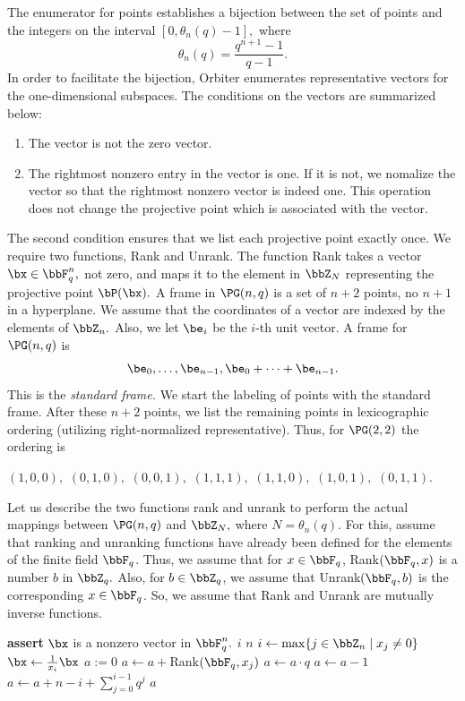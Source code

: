 The enumerator for points establishes a bijection between 
the set of points and the integers on the 
interval $[0,\theta_n(q)-1],$ 
where 
$$
\theta_n(q) = \frac{q^{n+1}-1}{q-1}.
$$
In order to facilitate the bijection, 
Orbiter enumerates representative vectors 
for the one-dimensional subspaces.
The conditions on the vectors are summarized below:
\begin{enumerate}
\item
The vector is not the zero vector.
\item
The rightmost nonzero entry in the vector is one. 
If it is not, we nomalize the vector 
so that the rightmost nonzero vector is indeed one. 
This operation does not change the projective 
point which is associated with the vector.
\end{enumerate}
The second condition ensures that we list 
each projective point exactly once.
We require two functions, 
{\sc Rank} and {\sc Unrank}. The function {\sc Rank} takes a vector 
$\bx \in \bbF_q^n,$ 
not zero, and maps it to the element in $\bbZ_N$ 
representing the projective point 
$\bP(\bx).$
A frame in $\PG(n,q)$ is a set of $n+2$ points, no $n+1$ in a hyperplane. 
We assume that the coordinates of a vector 
are indexed by the elements of $\bbZ_n.$ 
Also, we let $\be_i$ be the $i$-th unit vector. 
A frame for $\PG(n,q)$ is  
$$
\be_0,\ldots,\be_{n-1}, \be_0+\cdots+\be_{n-1}.
$$
This is the {\em standard frame.} 
We start the labeling of points with the  
standard frame. After these $n+2$ points, 
we list the remaining points 
in lexicographic ordering (utilizing right-normalized representative).
Thus, for $\PG(2,2)$ the  ordering is
\begin{center}
$(1,0,0),$
$(0,1,0),$
$(0,0,1),$
$(1,1,1),$
$(1,1,0),$
$(1,0,1),$
$(0,1,1).$
\end{center}
Let us describe the two functions rank and unrank 
to perform the actual mappings 
between $\PG(n,q)$ and $\bbZ_{N},$ where $N = \theta_n(q).$
For this, assume that ranking and unranking 
functions have already been defined for the 
elements of the finite field $\bbF_q$.
Thus, we assume that for $x \in \bbF_q$, 
{\sc Rank}$(\bbF_q,x)$ is a number $b$ in $\bbZ_q.$
Also, for $b \in \bbZ_q$, 
we assume that {\sc Unrank}$(\bbF_q,b)$ is the 
corresponding $x \in \bbF_q$.
So, we assume that 
{\sc Rank} and {\sc Unrank} are mutually inverse functions.  
\begin{algorithm}
\caption{Rank}\label{algo:Rank}
\begin{algorithmic}[1]
\State \textbf{assert} $\bx$ is a nonzero vector in $\bbF_q^n.$
\State \Return $i$
\EndIf
\If {$\bx = \bone$} 
\State \Return $n$
\EndIf
\State $i \gets \max\{j \in \bbZ_n \mid x_j \neq 0\}$
\State $\bx \gets \frac{1}{x_i} \bx$
\State $a := 0$
\State $a \gets a + ${\sc Rank}$(\bbF_q, x_j)$
\State $ a \gets a \cdot q$
\EndIf
\EndFor
{} 
\State $ a \gets a - 1$
\EndIf
\State $ a \gets a+ n - i + \sum_{j=0}^{i-1} q^j$
\State \Return $a$
\EndProcedure
\end{algorithmic}
\end{algorithm}
